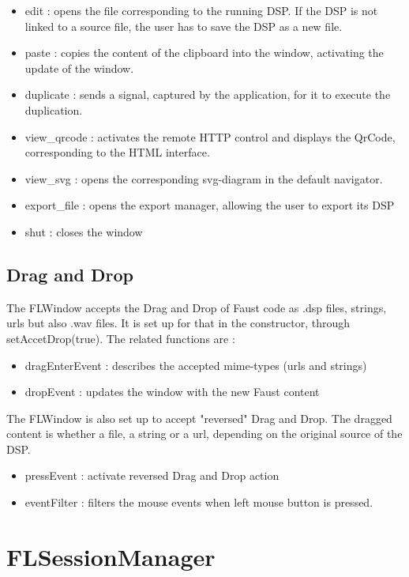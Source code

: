 \documentclass[a4paper]{article}
\begin{document}
\begin{itemize}
\item edit : opens the file corresponding to the running DSP. If the DSP is not linked to a source file, the user has to save the DSP as a new file.
\item paste : copies the content of the clipboard into the window, activating the update of the window.
\item duplicate : sends a signal, captured by the application, for it to execute the duplication. 
\item view\_qrcode : activates the remote HTTP control and displays the QrCode, corresponding to the HTML interface.
\item view\_svg : opens the corresponding svg-diagram in the default navigator.
\item export\_file : opens the export manager, allowing the user to export its DSP
\item shut : closes the window
\end{itemize}

\subsection{Drag and Drop}

The FLWindow accepts the Drag and Drop of Faust code as .dsp files, strings, urls but also .wav files. It is set up for that in the constructor, through setAccetDrop(true). The related functions are :

\begin{itemize}
\item dragEnterEvent : describes the accepted mime-types (urls and strings) 
\item dropEvent : updates the window with the new Faust content
\end{itemize}

The FLWindow is also set up to accept "reversed" Drag and Drop. The dragged content is whether a file, a string or a url, depending on the original source of the DSP. 

\begin{itemize}
\item pressEvent : activate reversed Drag and Drop action
\item eventFilter : filters the mouse events when left mouse button is pressed.
\end{itemize}

\section{FLSessionManager}
\end{document}
